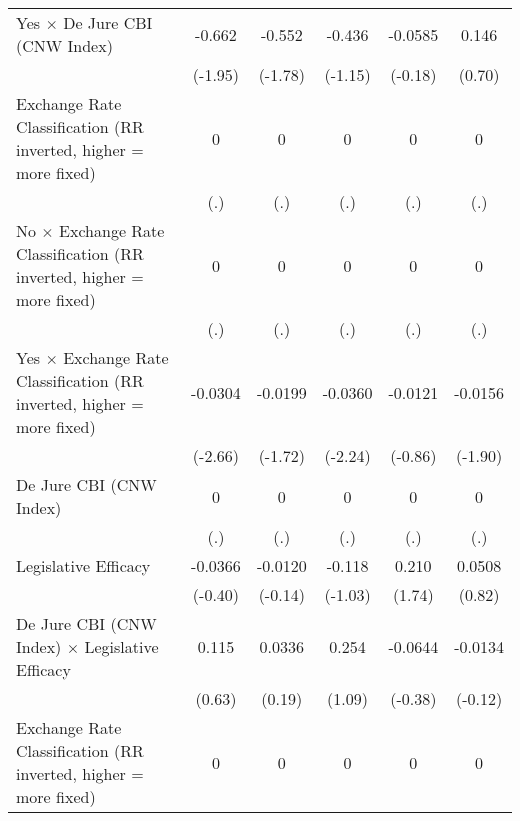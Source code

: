 {\begin{tabular*}{\linewidth}{@{\hskip\tabcolsep\extracolsep\fill}l*{5}{c}}
\addlinespace
Yes $\times$ De Jure CBI (CNW Index)&   -0.662         &   -0.552         &   -0.436         &  -0.0585         &    0.146         \\
                &  (-1.95)         &  (-1.78)         &  (-1.15)         &  (-0.18)         &   (0.70)         \\
\addlinespace
Exchange Rate Classification (RR inverted, higher = more fixed)&        0         &        0         &        0         &        0         &        0         \\
                &      (.)         &      (.)         &      (.)         &      (.)         &      (.)         \\
\addlinespace
No $\times$ Exchange Rate Classification (RR inverted, higher = more fixed)&        0         &        0         &        0         &        0         &        0         \\
                &      (.)         &      (.)         &      (.)         &      (.)         &      (.)         \\
\addlinespace
Yes $\times$ Exchange Rate Classification (RR inverted, higher = more fixed)&  -0.0304\sym{**} &  -0.0199         &  -0.0360\sym{*}  &  -0.0121         &  -0.0156         \\
                &  (-2.66)         &  (-1.72)         &  (-2.24)         &  (-0.86)         &  (-1.90)         \\
\addlinespace
De Jure CBI (CNW Index)&        0         &        0         &        0         &        0         &        0         \\
                &      (.)         &      (.)         &      (.)         &      (.)         &      (.)         \\
\addlinespace
Legislative Efficacy&  -0.0366         &  -0.0120         &   -0.118         &    0.210         &   0.0508         \\
                &  (-0.40)         &  (-0.14)         &  (-1.03)         &   (1.74)         &   (0.82)         \\
\addlinespace
De Jure CBI (CNW Index) $\times$ Legislative Efficacy&    0.115         &   0.0336         &    0.254         &  -0.0644         &  -0.0134         \\
                &   (0.63)         &   (0.19)         &   (1.09)         &  (-0.38)         &  (-0.12)         \\
\addlinespace
Exchange Rate Classification (RR inverted, higher = more fixed)&        0         &        0         &        0         &        0         &        0         \\

\end{tabular*}}
